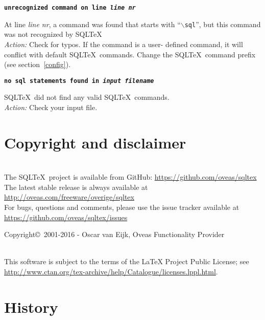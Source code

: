 \documentclass{article}
\newcommand{\bs}{\ensuremath{\backslash}}
\newcommand{\vs}{\vspace{3mm}}
\begin{document}
\vs

\noindent\textbf{\texttt{unrecognized command on line \textit{line nr}}}

\vspace{1mm}

\noindent At line \textit{line nr}, a command was found that starts with ``\texttt{\bs sql}'',
but this command was not recognized by SQL\TeX\. \\
\textit{Action:} Check for typos. If the command is a user- defined command, it will
conflict with default SQL\TeX\ commands. Change the SQL\TeX\ command prefix (see section~\ref{config}).

\vs

\noindent\textbf{\texttt{no sql statements found in \textit{input filename}}}

\vspace{1mm}

\noindent SQL\TeX\ did not find any valid SQL\TeX\ commands. \\
\textit{Action:} Check your input file.


\section{Copyright and disclaimer}

\noindent\hrulefill \\
The SQL\TeX\ project is available from GitHub: \url{https://github.com/oveas/sqltex}\\
The latest stable release is always available at \url{http://oveas.com/freeware/overige/sqltex}\\
For bugs, questions and comments, please use the issue tracker available at \url{https://github.com/oveas/sqltex/issues}

\vspace{3mm}

\noindent Copyright\copyright\ 2001-2016 - Oscar van Eijk, Oveas Functionality Provider

\noindent\hrulefill \\

\noindent This software is subject to the terms of the LaTeX Project Public License; 
see \url{http://www.ctan.org/tex-archive/help/Catalogue/licenses.lppl.html}.

\section{History}
\end{document}
